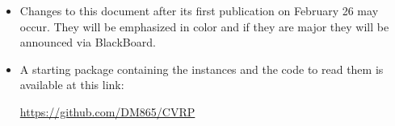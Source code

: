 \documentclass[a4paper,10pt]{article}
\begin{document}
\begin{itemize}
\item Changes to this document after its first publication on February 26
  may occur. They will be emphasized in color and if they are major they
  will be announced via BlackBoard.


\item A starting package containing the instances and the code to read
  them is available at this link:
\begin{center}
\url{https://github.com/DM865/CVRP}
\end{center}


\end{itemize}









\end{document}
